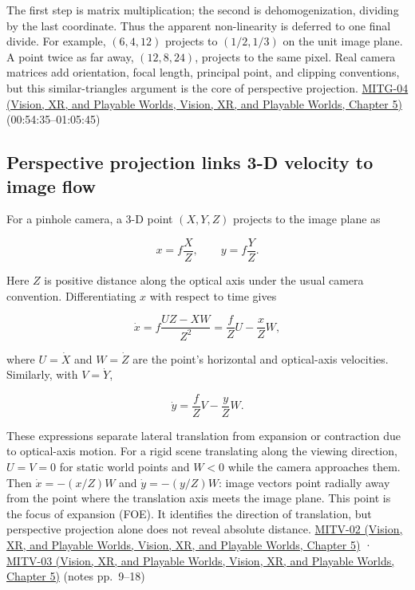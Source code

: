 The first step is matrix multiplication; the second is dehomogenization, dividing by the last coordinate. Thus the apparent non-linearity is deferred to one final divide. For example, \((6,4,12)\) projects to \((1/2,1/3)\) on the unit image plane. A point twice as far away, \((12,8,24)\), projects to the same pixel. Real camera matrices add orientation, focal length, principal point, and clipping conventions, but this similar-triangles argument is the core of perspective projection. \href{../07-Vision-XR-and-Playable-Worlds/main.pdf\#nameddest=04-visual-computing-ii-ch036-mitg-04---transformations}{MITG-04 (Vision, XR, and Playable Worlds, Vision, XR, and Playable Worlds, Chapter 5)} (00:54:35--01:05:45)

\subsection{Perspective projection links 3-D velocity to image flow}\label{03-visual-computing-i-ch003-perspective-projection-links-3-d-velocity-to-image-flow}

For a pinhole camera, a 3-D point \((X,Y,Z)\) projects to the image plane as

\[
x=f\frac{X}{Z},\qquad y=f\frac{Y}{Z}.
\]

Here \(Z\) is positive distance along the optical axis under the usual camera convention. Differentiating \(x\) with respect to time gives

\[
\dot{x}=f\frac{U Z-XW}{Z^2}=\frac{f}{Z}U-\frac{x}{Z}W,
\]

where \(U=\dot X\) and \(W=\dot Z\) are the point's horizontal and optical-axis velocities. Similarly, with \(V=\dot Y\),

\[
\dot{y}=\frac{f}{Z}V-\frac{y}{Z}W.
\]

These expressions separate lateral translation from expansion or contraction due to optical-axis motion. For a rigid scene translating along the viewing direction, \(U=V=0\) for static world points and \(W<0\) while the camera approaches them. Then \(\dot{x}=-(x/Z)W\) and \(\dot{y}=-(y/Z)W\): image vectors point radially away from the point where the translation axis meets the image plane. This point is the focus of expansion (FOE). It identifies the direction of translation, but perspective projection alone does not reveal absolute distance. \href{../07-Vision-XR-and-Playable-Worlds/main.pdf\#nameddest=04-visual-computing-ii-ch036-mitv-02---image-formation-perspective-projection-time-derivative-motion-field}{MITV-02 (Vision, XR, and Playable Worlds, Vision, XR, and Playable Worlds, Chapter 5)} · \href{../07-Vision-XR-and-Playable-Worlds/main.pdf\#nameddest=04-visual-computing-ii-ch036-mitv-03---time-to-contact-focus-of-expansion-direct-motion-vision-methods-noise-gain}{MITV-03 (Vision, XR, and Playable Worlds, Vision, XR, and Playable Worlds, Chapter 5)} (notes pp.~9--18)

